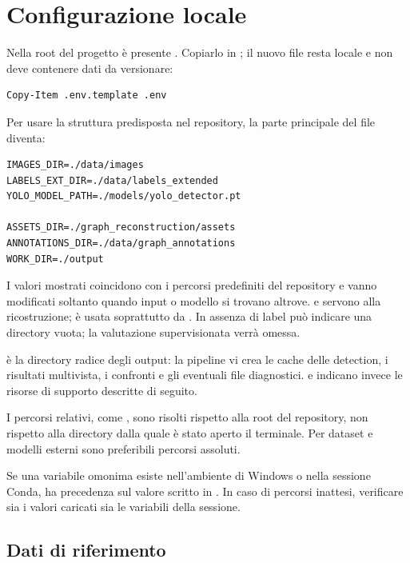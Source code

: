 \section{Configurazione locale}

Nella root del progetto è presente . Copiarlo in
; il nuovo file resta locale e non deve contenere dati da
versionare:

\begin{lstlisting}[language={}]
Copy-Item .env.template .env
\end{lstlisting}

Per usare la struttura predisposta nel repository, la parte principale del
file diventa:

\begin{lstlisting}[language={}]
IMAGES_DIR=./data/images
LABELS_EXT_DIR=./data/labels_extended
YOLO_MODEL_PATH=./models/yolo_detector.pt

ASSETS_DIR=./graph_reconstruction/assets
ANNOTATIONS_DIR=./data/graph_annotations
WORK_DIR=./output
\end{lstlisting}

I valori mostrati coincidono con i percorsi predefiniti del repository e vanno
modificati soltanto quando input o modello si trovano altrove.
 e  servono alla ricostruzione;
 è usata soprattutto da . In
assenza di label può indicare una directory vuota; la valutazione supervisionata
verrà omessa.

 è la directory radice degli output: la pipeline vi crea le
cache delle detection, i risultati multivista, i confronti e gli eventuali file
diagnostici.  e  indicano invece le
risorse di supporto descritte di seguito.

I percorsi relativi, come , sono risolti rispetto alla root
del repository, non rispetto alla directory dalla quale è stato aperto il
terminale. Per dataset e modelli esterni sono preferibili percorsi assoluti.

Se una variabile omonima esiste nell'ambiente di Windows o nella sessione
Conda, ha precedenza sul valore scritto in . In caso di percorsi
inattesi, verificare sia i valori caricati sia le variabili della sessione.

\subsection{Dati di riferimento}

